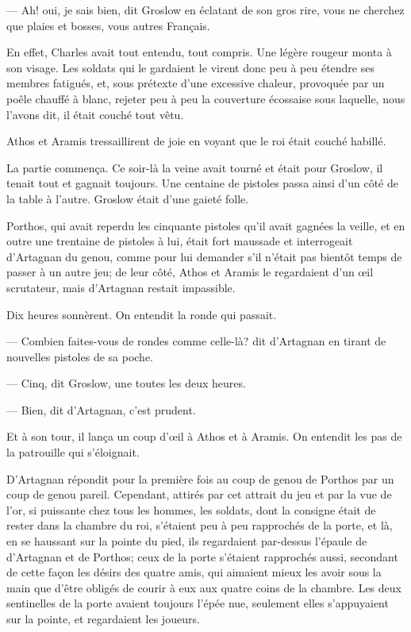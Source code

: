 — Ah! oui, je sais bien, dit Groslow en éclatant de son gros rire, vous ne cherchez que plaies et bosses, vous autres Français.

En effet, Charles avait tout entendu, tout compris. Une légère rougeur monta à son visage. Les soldats qui le gardaient le virent donc peu à peu étendre ses membres fatigués, et, sous prétexte d'une excessive chaleur, provoquée par un poêle chauffé à blanc, rejeter peu à peu la couverture écossaise sous laquelle, nous l'avons dit, il était couché tout vêtu.

Athos et Aramis tressaillirent de joie en voyant que le roi était couché habillé.

La partie commença. Ce soir-là la veine avait tourné et était pour Groslow, il tenait tout et gagnait toujours. Une centaine de pistoles passa ainsi d'un côté de la table à l'autre. Groslow était d'une gaieté folle.

Porthos, qui avait reperdu les cinquante pistoles qu'il avait gagnées la veille, et en outre une trentaine de pistoles à lui, était fort maussade et interrogeait d'Artagnan du genou, comme pour lui demander s'il n'était pas bientôt temps de passer à un autre jeu; de leur côté, Athos et Aramis le regardaient d'un œil scrutateur, mais d'Artagnan restait impassible.

Dix heures sonnèrent. On entendit la ronde qui passait.

— Combien faites-vous de rondes comme celle-là? dit d'Artagnan en tirant de nouvelles pistoles de sa poche.

— Cinq, dit Groslow, une toutes les deux heures.

— Bien, dit d'Artagnan, c'est prudent.

Et à son tour, il lança un coup d'œil à Athos et à Aramis. On entendit les pas de la patrouille qui s'éloignait.

D'Artagnan répondit pour la première fois au coup de genou de Porthos par un coup de genou pareil.
Cependant, attirés par cet attrait du jeu et par la vue de l'or, si puissante chez tous les hommes, les soldats, dont la consigne était de rester dans la chambre du roi, s'étaient peu à peu rapprochés de la porte, et là, en se haussant sur la pointe du pied, ils regardaient par-dessus l'épaule de d'Artagnan et de Porthos; ceux de la porte s'étaient rapprochés aussi, secondant de cette façon les désirs des quatre amis, qui aimaient mieux les avoir sous la main que d'être obligés de courir à eux aux quatre coins de la chambre. Les deux sentinelles de la porte avaient toujours l'épée nue, seulement elles s'appuyaient sur la pointe, et regardaient les joueurs.

